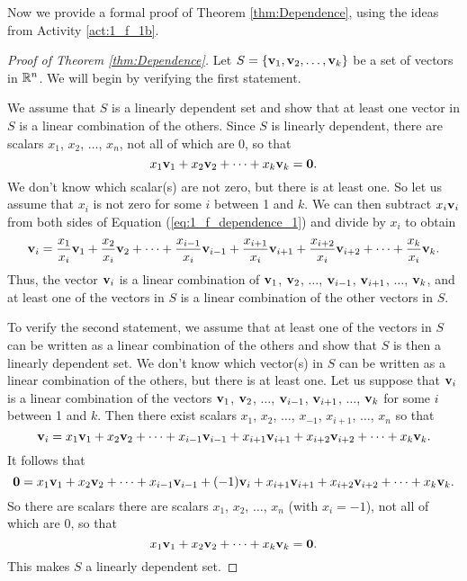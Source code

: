Now we provide a formal proof of Theorem \ref{thm:Dependence}, using the ideas from Activity \ref{act:1_f_1b}.

\begin{proof}[Proof of Theorem \ref{thm:Dependence}] Let $S = \{\mathbf{v}_1, \mathbf{v}_2, \ldots, \mathbf{v}_k\}$ be a set of vectors in $\mathbb{R}^n$.  We will begin by verifying the first statement.

We assume that $S$ is a linearly dependent set and show that at least one vector in $S$ is a linear combination of the others. Since $S$ is linearly dependent, there are scalars $x_1$, $x_2$, $\ldots$, $x_n$, not all of which are 0, so that 
\begin{equation} \label{eq:1_f_dependence_1} 
x_1\mathbf{v}_1 + x_2\mathbf{v}_2 + \cdots +  x_{k}\mathbf{v}_{k} = \mathbf{0}.
\end{equation}
We don't know which scalar(s) are not zero, but there is at least one. So let us assume that $x_i$ is not zero for some $i$ between 1 and $k$.  We can then subtract $x_i \mathbf{v}_i$ from both sides of Equation (\ref{eq:1_f_dependence_1}) and divide by $x_i$ to obtain
\[\mathbf{v}_i = \frac{x_1}{x_i}\mathbf{v}_1 + \frac{x_2}{x_i}\mathbf{v}_2 + \cdots + \frac{x_{i-1}}{x_i}\mathbf{v}_{i-1} +  \frac{x_{i+1}}{x_i}\mathbf{v}_{i+1} + \frac{x_{i+2}}{x_i}\mathbf{v}_{i+2} + \cdots + \frac{x_{k}}{x_i}\mathbf{v}_{k}.\]
Thus, the vector $\mathbf{v}_i$ is a linear combination of $\mathbf{v}_1$, $\mathbf{v}_2$, $\ldots$, $\mathbf{v}_{i-1}$, $\mathbf{v}_{i+1}$, $\ldots$, $\mathbf{v}_k$, and at least one of the vectors in $S$ is a linear combination of the other vectors in $S$. 

To verify the second statement, we assume that at least one of the vectors in $S$ can be written as a linear combination of the others and show that $S$ is then a linearly dependent set. We don't know which vector(s) in $S$ can be written as a linear combination of the others, but there is at least one. Let us suppose that $\mathbf{v}_i$ is a linear combination of the vectors $\mathbf{v}_1$, $\mathbf{v}_2$, $\ldots$, $\mathbf{v}_{i-1}$, $\mathbf{v}_{i+1}$, $\ldots$, $\mathbf{v}_k$ for some $i$ between 1 and $k$. Then there exist scalars  $x_1$, $x_2$, $\ldots$, $x_{-1}$, $x_{i+1}$, $\ldots$, $x_n$ so that 
\[\mathbf{v}_i = x_1\mathbf{v}_1 + x_2\mathbf{v}_2 + \cdots + x_{i-1}\mathbf{v}_{i-1} +  x_{i+1}\mathbf{v}_{i+1} + x_{i+2}\mathbf{v}_{i+2} + \cdots + x_{k}\mathbf{v}_{k}.\]
It follows that 
\[\mathbf{0} = x_1\mathbf{v}_1 + x_2\mathbf{v}_2 + \cdots + x_{i-1}\mathbf{v}_{i-1} +  (-1)\mathbf{v}_i + x_{i+1}\mathbf{v}_{i+1} + x_{i+2}\mathbf{v}_{i+2} + \cdots + x_{k}\mathbf{v}_{k}.\] 
So there are scalars there are scalars $x_1$, $x_2$, $\ldots$, $x_n$ (with $x_i = -1$), not all of which are 0, so that 
\[x_1\mathbf{v}_1 + x_2\mathbf{v}_2 + \cdots +  x_{k}\mathbf{v}_{k} = \mathbf{0}.\]
This makes $S$ a linearly dependent set. 
\end{proof}

